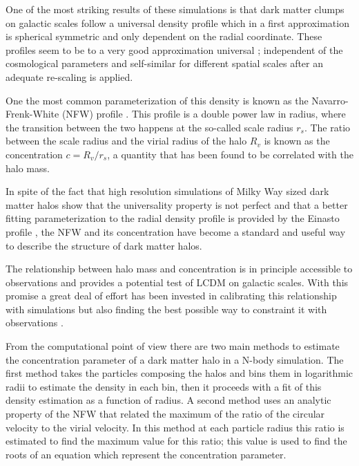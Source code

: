 \documentclass[useAMS,usenatbib]{mn2e}
\begin{document}
One of the most striking results of these simulations is that dark
matter clumps on galactic scales follow a universal density profile
which in a first approximation is spherical symmetric and only
dependent on the radial coordinate. These profiles seem to be to a
very good approximation universal \citep{NFW,Taylor2001}; independent
of the cosmological parameters and self-similar for different spatial
scales after an adequate re-scaling is applied. 

One the most common parameterization of this density is known as the
Navarro-Frenk-White (NFW) profile \citep{NFW}. This profile is a
double power law in radius, where the transition between the two
happens at the so-called scale radius $r_s$. The ratio between the
scale radius and the virial radius of the halo $R_v$ is known as the
concentration $c=R_v/r_s$, a quantity that has been found to be
correlated with the halo mass.

In spite of the fact that high resolution simulations of
Milky Way sized dark matter halos \citep{Navarro2010} show that the
universality property is not  perfect and that a better fitting
parameterization to the radial density profile is provided by the
Einasto profile \citep{Einasto1965}, the NFW and its concentration
have become a standard and useful way to describe the structure of
dark matter halos.


The relationship between halo mass and concentration is in principle
accessible to observations and provides a potential test of LCDM on
galactic scales. 
With this promise a great deal of effort has been
invested in calibrating this relationship with simulations
\citep{Neto2007,Duffy2008,Munoz2011,Prada2012,Ludlow2014} but also
finding the best possible way to constraint it with observations
\citep{Buote2007,Comerford2007,Mandelbaum2008,Giocoli2014,Foex2014,Shan2015}.

From the computational point of view there are two main methods to
estimate the concentration parameter of a dark matter halo in a N-body
simulation. The first method takes the particles composing the halos
and bins them in logarithmic radii to estimate the density in each
bin, then it proceeds with a fit of this density estimation as a
function of radius. A second method uses an analytic property of the
NFW that related the maximum of the ratio of the circular velocity to
the virial velocity. In this method at each particle radius this ratio
is estimated to find the maximum value for this ratio; this value is
used to find the roots of an equation which represent the
concentration parameter.
\end{document}
